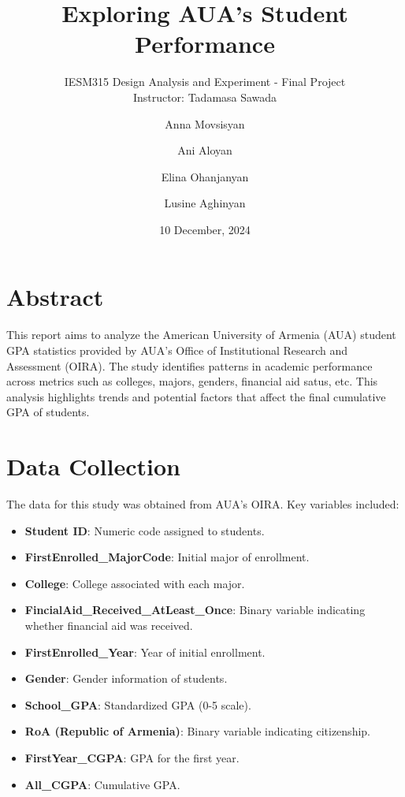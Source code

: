 \documentclass[
  12pt,
]{article}
\title{Exploring AUA's Student Performance}
\subtitle{IESM315 Design Analysis and Experiment - Final Project\\
Instructor: Tadamasa Sawada}
\author{Anna Movsisyan \and Ani Aloyan \and Elina Ohanjanyan \and Lusine
Aghinyan}
\date{10 December, 2024}
\providecommand{\tightlist}{%
  \setlength{\itemsep}{0pt}\setlength{\parskip}{0pt}}
\begin{document}
\maketitle

{
\setcounter{tocdepth}{2}
\tableofcontents
}
\doublespacing

\newpage

\section{Abstract}\label{abstract}

This report aims to analyze the American University of Armenia (AUA)
student GPA statistics provided by AUA's Office of Institutional
Research and Assessment (OIRA). The study identifies patterns in
academic performance across metrics such as colleges, majors, genders,
financial aid satus, etc. This analysis highlights trends and potential
factors that affect the final cumulative GPA of students.

\section{Data Collection}\label{data-collection}

The data for this study was obtained from AUA's OIRA. Key variables
included:

\begin{itemize}
\tightlist
\item
  \textbf{Student ID}: Numeric code assigned to students.
\item
  \textbf{FirstEnrolled\_MajorCode}: Initial major of enrollment.
\item
  \textbf{College}: College associated with each major.
\item
  \textbf{FincialAid\_Received\_AtLeast\_Once}: Binary variable
  indicating whether financial aid was received.
\item
  \textbf{FirstEnrolled\_Year}: Year of initial enrollment.
\item
  \textbf{Gender}: Gender information of students.
\item
  \textbf{School\_GPA}: Standardized GPA (0-5 scale).
\item
  \textbf{RoA (Republic of Armenia)}: Binary variable indicating
  citizenship.
\item
  \textbf{FirstYear\_CGPA}: GPA for the first year.
\item
  \textbf{All\_CGPA}: Cumulative GPA.
\end{itemize}
\end{document}
